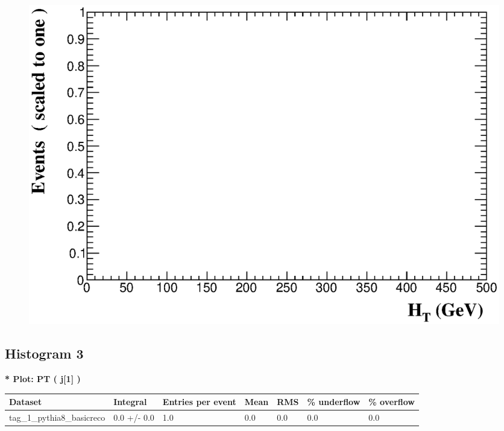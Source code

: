 \documentclass[a4paper, 10pt]{article}
\begin{document}
\begin{figure}[H]
  \begin{center}
    \includegraphics[scale=0.45]{selection_1.eps}\\
\caption{   }
  \end{center}
\end{figure}
      \newpage
\subsection{ Histogram 3}

\textbf{* Plot: PT ( j[1] ) }\\
   \begin{table}[H]
  \begin{center}
    \begin{tabular}{|m{23.0mm}|m{23.0mm}|m{18.0mm}|m{19.0mm}|m{19.0mm}|m{19.0mm}|m{19.0mm}|}
      \hline
      {\cellcolor{yellow}         Dataset}& {\cellcolor{yellow}         Integral}& {\cellcolor{yellow}         Entries per event}& {\cellcolor{yellow}         Mean}& {\cellcolor{yellow}         RMS}& {\cellcolor{yellow}         \% underflow}& {\cellcolor{yellow}         \% overflow}\\
      \hline
      {\cellcolor{white}         tag\_1\_pythia8\_basicreco}& {\cellcolor{white}         0.0 +/\-- 0.0}& {\cellcolor{white}         1.0}& {\cellcolor{white}         0.0}& {\cellcolor{white}         0.0}& {\cellcolor{green}         0.0}& {\cellcolor{green}         0.0}\\
\hline
    \end{tabular}
  \end{center}
\end{table}
\end{document}
